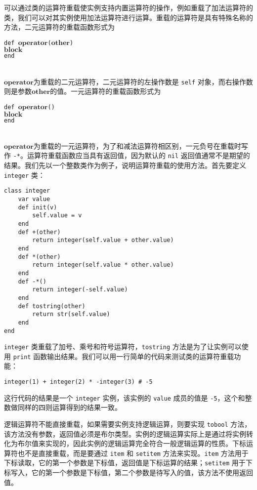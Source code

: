 可以通过类的运算符重载使实例支持内置运算符的操作，例如重载了加法运算符的类，我们可以对其实例使用加法运算符进行运算。重载的运算符是具有特殊名称的方法，二元运算符的重载函数形式为
\begin{algorithm}
    \texttt{def }$\bm{operator}$\texttt{(}$\bm{other}$\texttt{)}\\
    \qquad $\bm{block}$ \\
    \texttt{end}
\end{algorithm}\vspace{-0.6em}\\
$\bm{operator}$为重载的二元运算符，二元运算符的左操作数是 \texttt{self} 对象，而右操作数则是参数$\bm{other}$的值。一元运算符的重载函数形式为
\begin{algorithm}
    \texttt{def }$\bm{operator}$\texttt{()}\\
    \qquad $\bm{block}$ \\
    \texttt{end}
\end{algorithm}\vspace{-0.6em}\\
$\bm{operator}$为重载的一元运算符，为了和减法运算符相区别，一元负号在重载时写作 \texttt{-*}。运算符重载函数应当具有返回值，因为默认的 \texttt{nil} 返回值通常不是期望的结果。我们先以一个整数类作为例子，说明运算符重载的使用方法。首先要定义 \texttt{integer} 类：
\begin{lstlisting}[language=berry]
class integer
    var value
    def init(v)
        self.value = v
    end
    def +(other)
        return integer(self.value + other.value)
    end
    def *(other)
        return integer(self.value * other.value)
    end
    def -*()
        return integer(-self.value)
    end
    def tostring(other)
        return str(self.value)
    end
end
\end{lstlisting}
\texttt{integer} 类重载了加号、乘号和符号运算符，\texttt{tostring} 方法是为了让实例可以使用 \texttt{print} 函数输出结果。我们可以用一行简单的代码来测试类的运算符重载功能：
\begin{lstlisting}[language=berry, numbers=none]
integer(1) + integer(2) * -integer(3) # -5
\end{lstlisting}
这行代码的结果是一个 \texttt{integer} 实例，该实例的 \texttt{value} 成员的值是 \texttt{-5}，这个和整数做同样的四则运算得到的结果一致。

逻辑运算符不能直接重载，如果需要实例支持逻辑运算，则要实现 \texttt{tobool} 方法，该方法没有参数，返回值必须是布尔类型。实例的逻辑运算实际上是通过将实例转化为布尔值来实现的，因此实例的逻辑运算完全符合一般逻辑运算的性质。下标运算符也不是直接重载，而是要通过 \texttt{item} 和 \texttt{setitem} 方法来实现。\texttt{item} 方法用于下标读取，它的第一个参数是下标值，返回值是下标运算的结果；\texttt{setitem} 用于下标写入，它的第一个参数是下标值，第二个参数是待写入的值，该方法不使用返回值。

